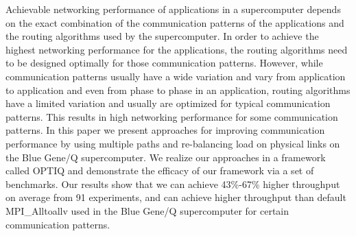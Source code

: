 Achievable networking performance of applications in a supercomputer depends on the exact combination of the communication patterns of the applications and the routing algorithms used by the supercomputer. In order to achieve the highest networking performance for the applications, the routing algorithms need to be designed optimally for those communication patterns. However, while communication patterns usually have a wide variation and vary from application to application and even from phase to phase in an application, routing algorithms have a limited variation and usually are optimized for typical communication patterns. This results in high networking performance for some communication patterns. In this paper we present approaches for improving communication performance by using multiple paths and re-balancing load on physical links on the Blue Gene/Q supercomputer. We realize our approaches in a framework called OPTIQ and demonstrate the efficacy of our framework via a set of benchmarks. Our results show that we can achieve 43\%-67\% higher throughput on average from 91 experiments, and can achieve higher throughput than default MPI\_Alltoallv used in the Blue Gene/Q supercomputer for certain communication patterns.
